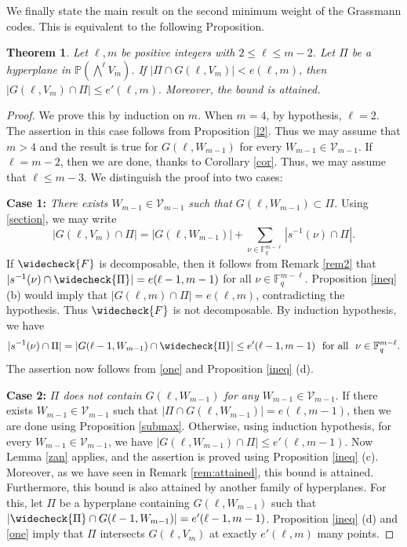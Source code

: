 \documentclass[10pt,a4paper,oneside]{amsproc}
\newtheorem{theorem}{Theorem}[section]
\newcommand{\Fq}{\mathbb{F}_q}
\def\Fq{{\mathbb F}_q}
\def\PP{{\mathbb P}}
\newcommand{\V}{{\mathcal{V}}}
\begin{document}
We finally state the main result on the second minimum weight of the Grassmann codes. This is equivalent to the following Proposition. 
\begin{theorem}\label{sec}
    Let $\ell, m$ be positive integers with $2 \le \ell \le m-2$. Let $\Pi$ be a hyperplane in $\PP(\bigwedge^{\ell} V_m)$. If $|\Pi \cap G(\ell, V_m)| < e (\ell, m)$, then 
    $|G(\ell, V_m) \cap \Pi| \le e' (\ell, m).$
    Moreover, the bound is attained. 
\end{theorem}

\begin{proof}
    We prove this by induction on $m$. When $m = 4$, by hypothesis, $\ell = 2$. The assertion in this case follows from Proposition \ref{l2}.  Thus we may assume that $m > 4$ and the result is true for $G(\ell, W_{m-1})$ for every $W_{m-1} \in \V_{m-1}$. If $\ell = m-2$, then we are done, thanks to Corollary \ref{cor}. Thus, we may assume that $\ell \le m-3$. We distinguish the proof into two cases:
    
    \textbf{Case 1:} \emph{There exists $W_{m-1} \in \V_{m-1}$ such that $G(\ell, W_{m-1}) \subset \Pi$.} Using \eqref{section}, we may write  \begin{equation}\label{one}|G(\ell, V_m) \cap \Pi| = |G(\ell, W_{m-1})| + \sum_{\nu \in \Fq^{m-\ell}} |s^{-1} (\nu) \cap \Pi|.\end{equation} 
    If $\widecheck{F}$ is decomposable, then it follows from  Remark \ref{rem2} that $|s^{-1} (\nu) \cap \widecheck{\Pi}| = e(\ell - 1, m-1)$ for all $\nu \in \Fq^{m- \ell}$.  
    Proposition \ref{ineq} (b) would imply that $|G(\ell, m) \cap \Pi| = e (\ell, m)$, contradicting the hypothesis. Thus $\widecheck{F}$ is not decomposable. By induction hypothesis, we have
    $$|s^{-1} (\nu) \cap \Pi| = |G(\ell - 1, W_{m-1}) \cap \widecheck{\Pi}| \le e'(\ell - 1, m-1) \ \ \text{for all} \ \ \nu \in \Fq^{m- \ell}.$$ The assertion now follows from \eqref{one} and Proposition \ref{ineq} (d).
    
    \textbf{Case 2:} \emph{$\Pi$ does not contain $G(\ell, W_{m-1})$ for any $W_{m-1} \in \V_{m-1}$}. If there exists $W_{m-1} \in \V_{m-1}$ such that $|\Pi \cap G(\ell, W_{m-1})| = e(\ell, m-1)$, then we are done using Proposition \ref{submax}.  
    Otherwise, using induction hypothesis, for every $W_{m-1} \in \V_{m-1}$, we have $|G(\ell, W_{m-1}) \cap \Pi| \le e'(\ell, m-1)$. Now Lemma \ref{zan} applies, and the assertion is proved using Proposition \ref{ineq} (c). 
    Moreover, as we have seen in Remark \ref{rem:attained}, this bound is attained. Furthermore, this bound is also attained by another family of hyperplanes. For this, let $\Pi$ be a hyperplane containing $G(\ell, W_{m-1})$ such that $|\widecheck{\Pi} \cap G(\ell - 1, W_{m-1})| = e'(\ell - 1, {m-1})$. Proposition \ref{ineq} (d) and \eqref{one} imply that $\Pi$ intersects $G(\ell, V_m)$ at exactly $e' (\ell, m)$ many points. 
    

\end{proof}
\end{document}
